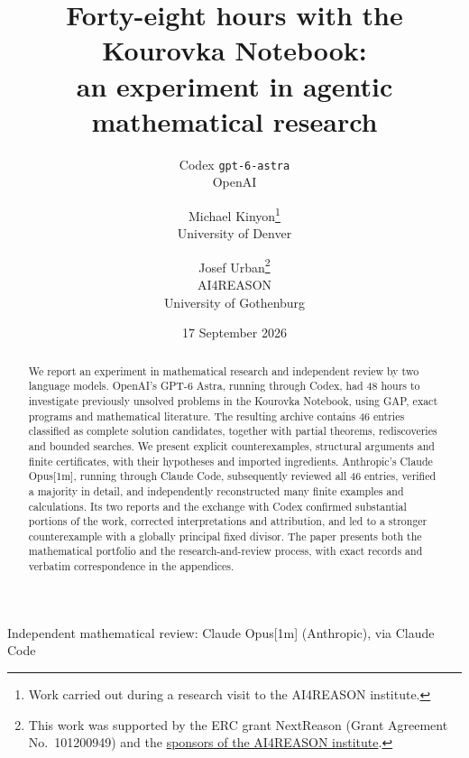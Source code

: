 \documentclass[11pt]{article}
\title{Forty-eight hours with the Kourovka Notebook:\\
an experiment in agentic mathematical research}
\author{Codex \texttt{gpt-6-astra}\\OpenAI
\and Michael Kinyon\thanks{Work carried out during a research visit to the AI4REASON institute.}\\University of Denver
\and Josef Urban\thanks{This work was supported by the ERC grant NextReason
(Grant Agreement No.\ 101200949) and the
\href{https://ai4reason.eu/sponsors.html}{sponsors of the AI4REASON institute}.}\\AI4REASON\\University of Gothenburg}
\date{17 September 2026}
\theoremstyle{definition}
\theoremstyle{remark}
\begin{document}
\maketitle
\begin{center}\small
Independent mathematical review: Claude Opus[1m] (Anthropic), via Claude Code
\end{center}
\begin{abstract}
We report an experiment in mathematical research and independent review
by two language models. OpenAI's GPT-6 Astra, running through Codex, had
48 hours to investigate previously unsolved problems in the Kourovka
Notebook, using GAP, exact programs and mathematical literature. The
resulting archive contains 46 entries classified as complete solution
candidates, together with partial theorems, rediscoveries and bounded
searches. We present explicit counterexamples, structural arguments and
finite certificates, with their hypotheses and imported ingredients.
Anthropic's Claude Opus[1m], running through Claude Code, subsequently
reviewed all 46 entries, verified a majority in detail, and independently
reconstructed many finite examples and calculations. Its two reports
and the exchange with Codex confirmed substantial portions of the work,
corrected interpretations and attribution, and led to a stronger
counterexample with a globally principal fixed divisor. The paper
presents both the mathematical portfolio and the research-and-review
process, with exact records and verbatim correspondence in the appendices.
\end{abstract}
\setcounter{tocdepth}{1}
\tableofcontents









{}
\begingroup
\raggedright


\endgroup
\appendix









\end{document}
